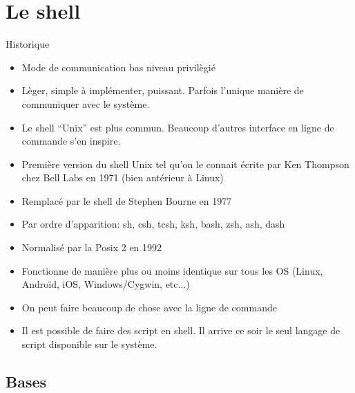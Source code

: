 %
%
%

\section{Le shell}

\begin{frame}
  \partpage
\end{frame}

\begin{frame}
  \tableofcontents[currentpart]
\end{frame}

\begin{frame}[fragile=singleslide]{Historique}
  \begin{itemize}
  \item Mode de communication bas niveau privilègié
  \item  Lèger,  simple  à  implémenter, puissant.   Parfois  l'unique
    manière de communiquer avec le système.
  \item Le shell ``Unix'' est plus commun. Beaucoup d'autres interface
    en ligne de commande s'en inspire.
  \item Première version du shell Unix tel qu'on le connait écrite par
    Ken Thompson chez Bell Labs en 1971 (bien antérieur à Linux)
  \item Remplacé par le shell de Stephen Bourne en 1977
  \item Par ordre d'apparition: sh, csh, tcsh, ksh, bash, zsh, ash,
    dash
  \item Normalisé par la Posix 2 en 1992
  \item Fonctionne de manière plus ou moins identique sur tous les OS
    (Linux, Androïd, iOS, Windows/Cygwin, etc...)
  \item On peut faire beaucoup de chose avec la ligne de commande
  \item Il est possible de faire des script en shell. Il arrive ce
    soir le seul langage de script disponible sur le système.
  \end{itemize}
\end{frame}

\subsection{Bases}


